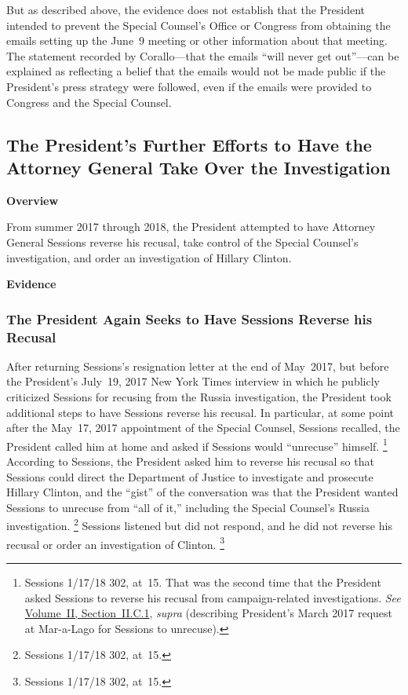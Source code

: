 But as described above, the evidence does not establish that the President intended to prevent the Special Counsel's Office or Congress from obtaining the emails setting up the June~9 meeting or other information about that meeting.
The statement recorded by Corallo---that the emails ``will never get out''---can be explained as reflecting a belief that the emails would not be made public if the President's press strategy were followed, even if the emails were provided to Congress and the Special Counsel.

\subsection{The President's Further Efforts to Have the Attorney General Take Over the Investigation}

\begin{center}
\textbf{Overview}
\end{center}

From summer 2017 through 2018, the President attempted to have Attorney General Sessions reverse his recusal, take control of the Special Counsel's investigation, and order an investigation of Hillary Clinton.

\begin{center}
\textbf{Evidence}
\end{center}

\subsubsection{The President Again Seeks to Have Sessions Reverse his Recusal}

After returning Sessions's resignation letter at the end of May~2017, but before the President's July~19, 2017 New York Times interview in which he publicly criticized Sessions for recusing from the Russia investigation, the President took additional steps to have Sessions reverse his recusal.
In particular, at some point after the May~17, 2017 appointment of the Special Counsel, Sessions recalled, the President called him at home and asked if Sessions would ``unrecuse'' himself.%
\footnote{Sessions 1/17/18 302, at~15.
That was the second time that the President asked Sessions to reverse his recusal from campaign-related investigations.
\textit{See} \hyperlink{subsubsection.2.2.3.1}{Volume~II, Section~II.C.1}, \textit{supra} (describing President's March 2017 request at Mar-a-Lago for Sessions to unrecuse).
}
According to Sessions, the President asked him to reverse his recusal so that Sessions could direct the Department of Justice to investigate and prosecute Hillary Clinton, and the ``gist'' of the conversation was that the President wanted Sessions to unrecuse from ``all of it,'' including the Special Counsel's Russia investigation.%
\footnote{Sessions 1/17/18 302, at~15.}
Sessions listened but did not respond, and he did not reverse his recusal or order an investigation of Clinton.%
\footnote{Sessions 1/17/18 302, at~15.}

